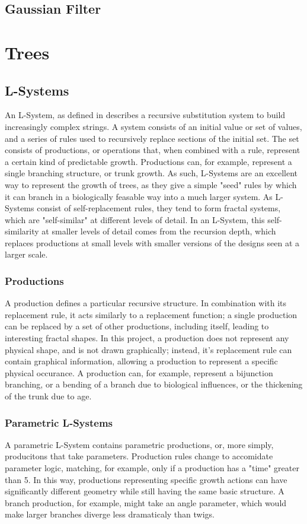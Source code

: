 \documentclass{article}
\newcommand{\tab}{\hspace*{2em}}
\begin{document}
        \subsection{Gaussian Filter}

    \section{Trees}
        \subsection{L-Systems}
    \tab An L-System, as defined in \cite{abp96} describes a recursive substitution system to
build increasingly complex strings. A system consists of an initial value or set of values, and a
series of rules used to recursively replace sections of the initial set. The set consists of
productions, or operations that, when combined with a rule, represent a certain kind of predictable
growth. Productions can, for example, represent a single branching structure, or trunk growth. As
such, L-Systems are an excellent way to represent the growth of trees, as they give a simple "seed"
rules by which it can branch in a biologically feasable way into a much larger system. As L-Systems
consist of self-replacement rules, they tend to form fractal systems, which are "self-similar" at
different levels of detail. In an L-System, this self-similarity at smaller levels of detail comes
from the recursion depth, which replaces productions at small levels with smaller versions of the
designs seen at a larger scale.


            \subsubsection{Productions}
    \tab A production defines a particular recursive structure. In combination with its replacement
rule, it acts similarly to a replacement function; a single production can be replaced by a set of
other productions, including itself, leading to interesting fractal shapes. In this project, a
production does not represent any physical shape, and is not drawn graphically; instead, it's 
replacement rule can contain graphical information, allowing a production to represent a specific
physical occurance. A production can, for example, represent a bijunction branching, or a bending
of a branch due to biological influences, or the thickening of the trunk due to age.

            \subsubsection{Parametric L-Systems}
    \tab A parametric L-System contains parametric productions, or, more simply, producitons that
take parameters. Production rules change to accomidate parameter logic, matching, for example, only
if a production has a "time" greater than 5. In this way, productions representing specific growth
actions can have significantly different geometry while still having the same basic structure. A
branch production, for example, might take an angle parameter, which would make larger branches
diverge less dramaticaly than twigs.
\end{document}
